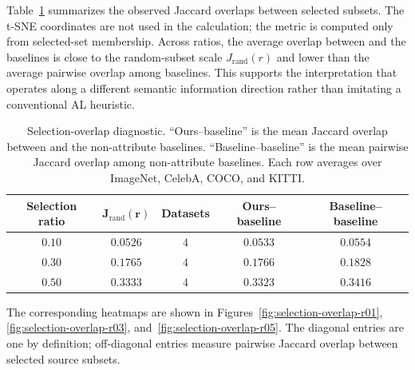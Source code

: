 Table~\ref{tab:selection-overlap-summary} summarizes the observed Jaccard overlaps between selected subsets. The t-SNE coordinates are not used in the calculation; the metric is computed only from selected-set membership. Across ratios, the average overlap between \model and the baselines is close to the random-subset scale $J_{\mathrm{rand}}(r)$ and lower than the average pairwise overlap among baselines. This supports the interpretation that \model operates along a different semantic information direction rather than imitating a conventional AL heuristic.

\begin{table}[htbp]
\centering
\caption{Selection-overlap diagnostic. ``Ours--baseline'' is the mean Jaccard overlap between \model and the non-attribute baselines. ``Baseline--baseline'' is the mean pairwise Jaccard overlap among non-attribute baselines. Each row averages over ImageNet, CelebA, COCO, and KITTI.}
\label{tab:selection-overlap-summary}
\begin{tabular}{c c c c c}
\toprule
\rowcolor{sectiongray} \textbf{Selection ratio} & $\boldsymbol{J_{\mathrm{rand}}(r)}$ & \textbf{Datasets} & \textbf{Ours--baseline} & \textbf{Baseline--baseline} \\
\midrule
$0.10$ & $0.0526$ & $4$ & $0.0533$ & $0.0554$ \\
$0.30$ & $0.1765$ & $4$ & $0.1766$ & $0.1828$ \\
$0.50$ & $0.3333$ & $4$ & $0.3323$ & $0.3416$ \\
\bottomrule
\end{tabular}
\end{table}

The corresponding heatmaps are shown in Figures~\ref{fig:selection-overlap-r01}, \ref{fig:selection-overlap-r03}, and~\ref{fig:selection-overlap-r05}. The diagonal entries are one by definition; off-diagonal entries measure pairwise Jaccard overlap between selected source subsets.

